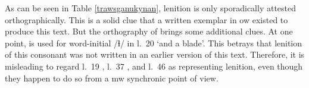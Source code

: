 
As can be seen in Table \ref{trawsganukynan}, lenition is only sporadically attested orthographically. This is a solid clue that a written exemplar in \gls{ow} existed to produce this text. But the orthography of  brings some additional clues. At one point,   is used for word-initial /ɬ/ in l.~20  `and a blade'. This betrays that lenition of this consonant was not written in an earlier version of this text. Therefore, it is misleading to regard l.~19 , l.~37 , and l.~46  as representing lenition, even though they happen to do so from a \gls{mw} synchronic point of view.

